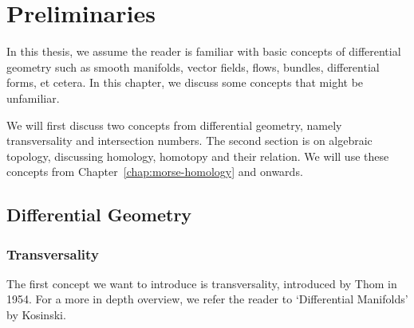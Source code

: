 \setcounter{chapter}{-1}
\chapter{Preliminaries}

In this thesis, we assume the reader is familiar with basic concepts of differential geometry such as smooth manifolds, vector fields, flows, bundles, differential forms, et cetera.
In this chapter, we discuss some concepts that might be unfamiliar.

We will first discuss two concepts from differential geometry, namely transversality and intersection numbers.
The second section is on algebraic topology, discussing homology, homotopy and their relation. We will use these concepts from Chapter~\ref{chap:morse-homology} and onwards.

\section*{Differential Geometry}
\subsection*{Transversality}
The first concept we want to introduce is transversality, introduced by Thom in 1954.
For a more in depth overview, we refer the reader to `Differential Manifolds' by Kosinski.

